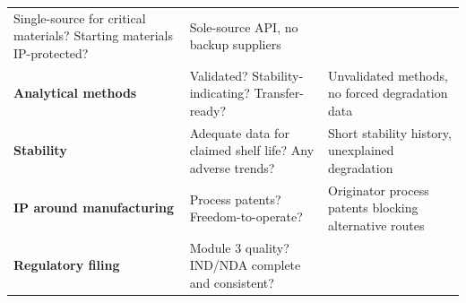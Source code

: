 \documentclass[
  11pt,
  a4paper,
]{report}
\begin{document}
\begin{longtable}[]{@{}lll@{}}
\begin{minipage}[t]{0.40\columnwidth}
Single-source for critical materials? Starting materials
IP-protected?\strut
\end{minipage} & \begin{minipage}[t]{0.33\columnwidth}\raggedright
Sole-source API, no backup suppliers\strut
\end{minipage}\tabularnewline
\begin{minipage}[t]{0.18\columnwidth}\raggedright
\textbf{Analytical methods}\strut
\end{minipage} & \begin{minipage}[t]{0.40\columnwidth}\raggedright
Validated? Stability-indicating? Transfer-ready?\strut
\end{minipage} & \begin{minipage}[t]{0.33\columnwidth}\raggedright
Unvalidated methods, no forced degradation data\strut
\end{minipage}\tabularnewline
\begin{minipage}[t]{0.18\columnwidth}\raggedright
\textbf{Stability}\strut
\end{minipage} & \begin{minipage}[t]{0.40\columnwidth}\raggedright
Adequate data for claimed shelf life? Any adverse trends?\strut
\end{minipage} & \begin{minipage}[t]{0.33\columnwidth}\raggedright
Short stability history, unexplained degradation\strut
\end{minipage}\tabularnewline
\begin{minipage}[t]{0.18\columnwidth}\raggedright
\textbf{IP around manufacturing}\strut
\end{minipage} & \begin{minipage}[t]{0.40\columnwidth}\raggedright
Process patents? Freedom-to-operate?\strut
\end{minipage} & \begin{minipage}[t]{0.33\columnwidth}\raggedright
Originator process patents blocking alternative routes\strut
\end{minipage}\tabularnewline
\begin{minipage}[t]{0.18\columnwidth}\raggedright
\textbf{Regulatory filing}\strut
\end{minipage} & \begin{minipage}[t]{0.40\columnwidth}\raggedright
Module 3 quality? IND/NDA complete and consistent?\strut
\end{minipage} & \begin{minipage}[t]{0.33\columnwidth}\raggedright

\end{minipage}
\end{longtable}
\end{document}
